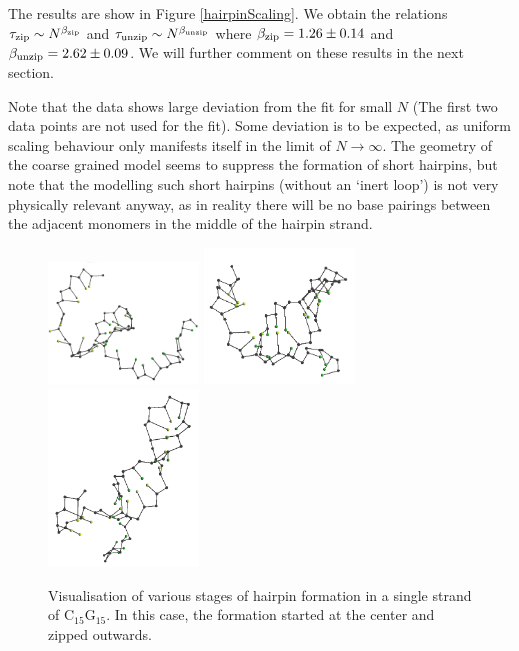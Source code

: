 The results are show in Figure \ref{hairpinScaling}. We obtain the relations ${\tau_\text{zip}} \sim N^{\beta_\text{zip}}$ and ${\tau_\text{unzip}} \sim N^{\beta_\text{unzip}}$ where ${\beta_\text{zip}} = 
1.26 \pm 0.14$ and ${\beta_\text{unzip}} = 2.62 \pm 0.09$. We will further comment on these results in the next section.

Note that the data shows large deviation from the fit for small $N$ (The first two data points are not used for the fit). Some deviation is to be expected, as uniform scaling behaviour only manifests itself in the limit of $N \to \infty$. The geometry of the coarse grained model seems to suppress the formation of short hairpins, but note that the modelling such short hairpins (without an `inert loop') is not very physically relevant anyway, as in reality there will be no base pairings between the adjacent monomers in the middle of the hairpin strand.


\begin{figure}[hbt]
\begin{center}
\includegraphics[width=4cm]{images/G15C15_1}
\includegraphics[width=4cm]{images/G15C15_2}
\includegraphics[width=4cm]{images/G15C15_3}
\end{center}
\caption{Visualisation of various stages of hairpin formation in a single strand of C$_{15}$G$_{15}$. In this case, the formation started at the center and zipped outwards.}
\label{results_hairpin}
\end{figure}




